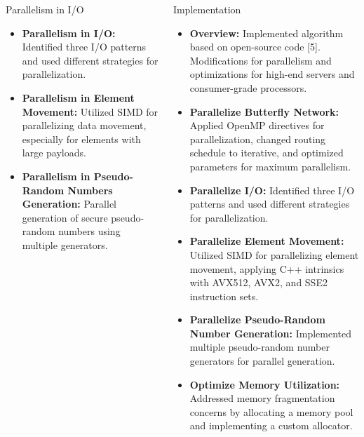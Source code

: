 \documentclass[final,hyperref={pdfpagelabels=false}]{beamer}
\begin{document}
\begin{frame}
\begin{columns}[t]
\begin{column}{.30\linewidth}
      \begin{block}{Parallelism in I/O}
        \begin{itemize}
          \item \textbf{Parallelism in I/O:} Identified three I/O patterns and used different strategies for parallelization.
          \item \textbf{Parallelism in Element Movement:} Utilized SIMD for parallelizing data movement, especially for elements with large payloads.
          \item \textbf{Parallelism in Pseudo-Random Numbers Generation:} Parallel generation of secure pseudo-random numbers using multiple generators.
        \end{itemize}
      \end{block}

    \end{column}

    \begin{column}{.30\linewidth}

      \begin{block}{Implementation}
        \begin{itemize}
          \item \textbf{Overview:} Implemented algorithm based on open-source code [5]. Modifications for parallelism and optimizations for high-end servers and consumer-grade processors.
          \item \textbf{Parallelize Butterfly Network:} Applied OpenMP directives for parallelization, changed routing schedule to iterative, and optimized parameters for maximum parallelism.
          \item \textbf{Parallelize I/O:} Identified three I/O patterns and used different strategies for parallelization.
          \item \textbf{Parallelize Element Movement:} Utilized SIMD for parallelizing element movement, applying C++ intrinsics with AVX512, AVX2, and SSE2 instruction sets.
          \item \textbf{Parallelize Pseudo-Random Number Generation:} Implemented multiple pseudo-random number generators for parallel generation.
          \item \textbf{Optimize Memory Utilization:} Addressed memory fragmentation concerns by allocating a memory pool and implementing a custom allocator.
        \end{itemize}
      \end{block}

    \end{column}

  \end{columns}
\end{frame}
\end{document}
